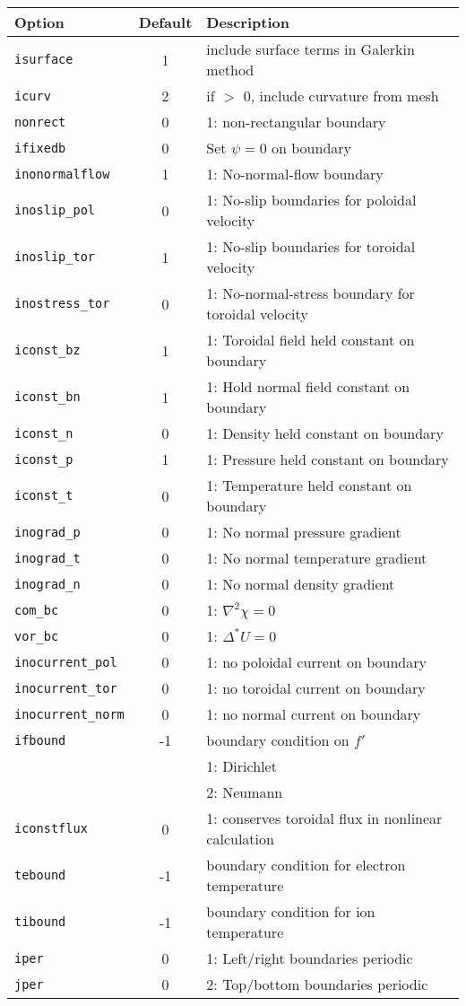 \begin{tabular}{lcp{4.0in}}
  \textbf{Option} & \textbf{Default} & \textbf{Description}\\
  \hline
 
  \texttt{isurface} & 1 & include surface terms in Galerkin method \\
  \texttt{icurv}    & 2 & if $>$ 0, include curvature from mesh \\
  \texttt{nonrect}  & 0 & 1: non-rectangular boundary \\
  \texttt{ifixedb} & 0 & Set $\psi=0$ on boundary\\
  \texttt{inonormalflow}& 1 & 1: No-normal-flow boundary\\
  \texttt{inoslip\_pol} & 0 & 1: No-slip boundaries for poloidal velocity\\
  \texttt{inoslip\_tor} & 1 & 1: No-slip boundaries for toroidal velocity\\
  \texttt{inostress\_tor}&0 & 1: No-normal-stress boundary for toroidal 
                                 velocity\\
  \texttt{iconst\_bz} & 1 & 1: Toroidal field held constant on boundary\\
  \texttt{iconst\_bn} & 1 & 1: Hold normal field constant on boundary \\
  \texttt{iconst\_n}  & 0 & 1: Density held constant on boundary\\
  \texttt{iconst\_p}  & 1 & 1: Pressure held constant on boundary\\
  \texttt{iconst\_t}  & 0 & 1: Temperature held constant on boundary\\
  \texttt{inograd\_p} & 0 & 1: No normal pressure gradient\\
  \texttt{inograd\_t} & 0 & 1: No normal temperature gradient\\
  \texttt{inograd\_n} & 0 & 1: No normal density gradient \\
  \texttt{com\_bc}& 0 & 1: $\nabla^2 \chi = 0$\\
  \texttt{vor\_bc}& 0 & 1: $\Delta^* U = 0$\\
  \texttt{inocurrent\_pol} & 0 & 1: no poloidal current on boundary \\
  \texttt{inocurrent\_tor} & 0 & 1: no toroidal current on boundary \\
  \texttt{inocurrent\_norm}& 0 & 1: no normal current on boundary \\
  \texttt{ifbound}  & -1 & boundary condition on $f\prime$  \\
                    &    & 1: Dirichlet  \\
                    &    & 2: Neumann    \\
  \texttt{iconstflux}  & 0 & 1: conserves toroidal flux in nonlinear calculation \\
  \texttt{tebound}     & -1 & boundary condition for electron temperature \\
  \texttt{tibound}     & -1 & boundary condition for ion temperature \\
  \texttt{iper}   & 0 & 1: Left/right boundaries periodic\\
  \texttt{jper}   & 0 & 2: Top/bottom boundaries periodic\\


\end{tabular}
